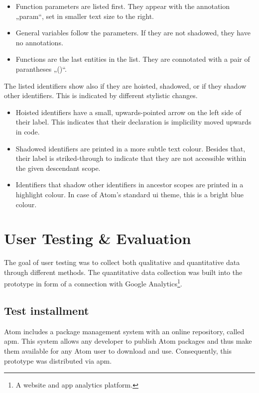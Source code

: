 \begin{itemize}
\itemsep1pt\parskip0pt
\item
  Function parameters are listed first. They appear with the annotation
  „param“, set in smaller text size to the right.
\item
  General variables follow the parameters. If they are not shadowed,
  they have no annotations.
\item
  Functions are the last entities in the list. They are connotated with
  a pair of parantheses „()“.
\end{itemize}

The listed identifiers show also if they are hoisted, shadowed, or if
they shadow other identifiers. This is indicated by different stylistic
changes.

\begin{itemize}
\itemsep1pt\parskip0pt
\item
  Hoisted identifiers have a small, upwards-pointed arrow on the left
  side of their label. This indicates that their declaration is
  implicility moved upwards in code.
\item
  Shadowed identifiers are printed in a more subtle text colour. Besides
  that, their label is striked-through to indicate that they are not
  accessible within the given descendant scope.
\item
  Identifiers that shadow other identifiers in ancestor scopes are
  printed in a highlight colour. In case of Atom’s standard \ac{ui}
  theme, this is a bright blue colour.
\end{itemize}

\section{User Testing \& Evaluation}\label{user-testing-evaluation}

The goal of user testing was to collect both qualitative and
quantitative data through different methods. The quantitative data
collection was built into the prototype in form of a connection with
Google Analytics\footnote{A website and app analytics platform.}.

\subsection{Test installment}\label{test-installment}

Atom includes a package management system with an online repository,
called \ac{apm}. This system allows any developer to publish Atom
packages and thus make them available for any Atom user to download and
use. Consequently, this prototype was distributed via \ac{apm}.

